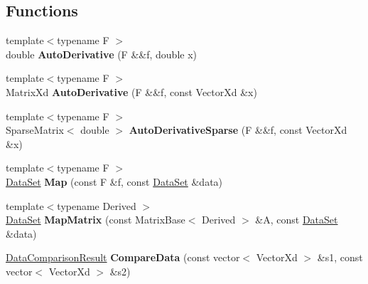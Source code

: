 \subsection*{Functions}
\begin{DoxyCompactItemize}
\item 
\hypertarget{namespace_d_r_d_s_p_a85a9c6880f005c325beacaf462769c3c}{{\footnotesize template$<$typename F $>$ }\\double {\bfseries Auto\-Derivative} (F \&\&f, double x)}\label{namespace_d_r_d_s_p_a85a9c6880f005c325beacaf462769c3c}

\item 
\hypertarget{namespace_d_r_d_s_p_a8db956974b1ddd9363bd634ff0f76592}{{\footnotesize template$<$typename F $>$ }\\Matrix\-Xd {\bfseries Auto\-Derivative} (F \&\&f, const Vector\-Xd \&x)}\label{namespace_d_r_d_s_p_a8db956974b1ddd9363bd634ff0f76592}

\item 
\hypertarget{namespace_d_r_d_s_p_a33db706bcd6b21acdd9f6aa33f4d025a}{{\footnotesize template$<$typename F $>$ }\\Sparse\-Matrix$<$ double $>$ {\bfseries Auto\-Derivative\-Sparse} (F \&\&f, const Vector\-Xd \&x)}\label{namespace_d_r_d_s_p_a33db706bcd6b21acdd9f6aa33f4d025a}

\item 
\hypertarget{namespace_d_r_d_s_p_ab2c51be01dedfe38fefbe27d8513419f}{{\footnotesize template$<$typename F $>$ }\\\hyperlink{struct_d_r_d_s_p_1_1_data_set}{Data\-Set} {\bfseries Map} (const F \&f, const \hyperlink{struct_d_r_d_s_p_1_1_data_set}{Data\-Set} \&data)}\label{namespace_d_r_d_s_p_ab2c51be01dedfe38fefbe27d8513419f}

\item 
\hypertarget{namespace_d_r_d_s_p_a0a11ce55bcfae130e6405d6e8d8f9df7}{{\footnotesize template$<$typename Derived $>$ }\\\hyperlink{struct_d_r_d_s_p_1_1_data_set}{Data\-Set} {\bfseries Map\-Matrix} (const Matrix\-Base$<$ Derived $>$ \&A, const \hyperlink{struct_d_r_d_s_p_1_1_data_set}{Data\-Set} \&data)}\label{namespace_d_r_d_s_p_a0a11ce55bcfae130e6405d6e8d8f9df7}

\item 
\hypertarget{namespace_d_r_d_s_p_a146d06d4b6739d58e1517bc1e21a569b}{\hyperlink{struct_d_r_d_s_p_1_1_data_comparison_result}{Data\-Comparison\-Result} {\bfseries Compare\-Data} (const vector$<$ Vector\-Xd $>$ \&s1, const vector$<$ Vector\-Xd $>$ \&s2)}\label{namespace_d_r_d_s_p_a146d06d4b6739d58e1517bc1e21a569b}


\end{DoxyCompactItemize}
